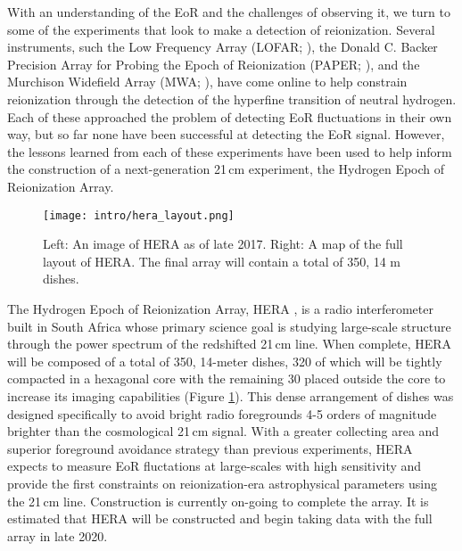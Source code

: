 With an understanding of the EoR and the challenges of observing it, we turn to
some of the experiments that look to make a detection of reionization. Several
instruments, such the Low Frequency Array (LOFAR; \cite{2013A&A...550A.136Y}), the Donald C. Backer Precision Array
for Probing the Epoch of Reionization (PAPER; \cite{2010AJ....139.1468P}), and the Murchison Widefield Array (MWA; \cite{2013PASA...30....7T}),
have come online to help constrain reionization through the detection of the hyperfine
transition of neutral hydrogen. Each of these approached the problem of detecting
EoR fluctuations in their own way, but so far none have been successful at
detecting the EoR signal. However, the lessons learned from each of these experiments
have been used to help inform the construction of a next-generation 21\,cm experiment,
the Hydrogen Epoch of Reionization Array.

\begin{figure}[ht]
	\centering
	\texttt{[image: intro/hera\_layout.png]}
	\caption[HERA Image and Layout]{Left: An image of HERA as of late 2017. Right: A map of
					 the full layout of HERA. The final array will contain a total of 350, 14 m dishes.}
	\label{fig:hera_layout}
\end{figure}

The Hydrogen Epoch of Reionization Array, HERA \cite{2017PASP..129d5001D}, is
a radio interferometer built in South Africa whose primary science goal is
studying large-scale structure through the power spectrum of the redshifted 21\,cm
line. When complete, HERA will be composed of a total of 350, 14-meter dishes, 320
of which will be tightly compacted in a hexagonal core with the remaining 30 placed
outside the core to increase its imaging capabilities (Figure \ref{fig:hera_layout}). This dense arrangement of
dishes was designed specifically to avoid bright radio foregrounds 4-5 orders of
magnitude brighter than the cosmological 21\,cm signal. With a greater collecting
area and superior foreground avoidance strategy than previous experiments, HERA
expects to measure EoR fluctations at large-scales with high sensitivity and
provide the first constraints on reionization-era astrophysical parameters using
the 21\,cm line. Construction is currently on-going to complete the array. It is estimated
that HERA will be constructed and begin taking data with the full array in late 2020.
